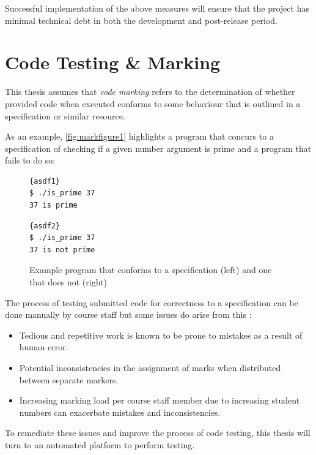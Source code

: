 \documentclass[hidelinks]{report}
\begin{document}
Successful implementation of the above measures will ensure that the project has minimal technical debt in both the development and post-release period.

\section{Code Testing \& Marking}

This thesis assumes that \textit{code marking} refers to the determination of whether provided code when executed conforms to some behaviour that is outlined in a specification or similar resource.

As an example, \autoref{fig:markfigure1} highlights a program that concurs to a specification of checking if a given number argument is prime and a program that fails to do so:

\begin{figure}[h]
	\centering
	\noindent
	\begin{multicols}{2}
		\begin{lstlisting}[linewidth=0.95\linewidth, title=Correct Program, frame=tlrb]{asdf1}
$ ./is_prime 37
37 is prime
		\end{lstlisting}
		\begin{lstlisting}[linewidth=0.95\linewidth, title=Incorrect Program, frame=tlrb]{asdf2}
$ ./is_prime 37
37 is not prime
		\end{lstlisting}
	\end{multicols}
	\caption{Example program that conforms to a specification (left) and one that does not (right)}
	\label{fig:markfigure1}
\end{figure}

The process of testing submitted code for correctness to a specification can be done manually by course staff but some issues do arise from this \cite{ManualProblem}:
\begin{itemize}
	\item Tedious and repetitive work is known to be prone to mistakes as a result of human error.
	\item Potential inconsistencies in the assignment of marks when distributed between separate markers.
	\item Increasing marking load per course staff member due to increasing student numbers can exacerbate mistakes and inconsistencies.
\end{itemize}

To remediate these issues and improve the process of code testing, this thesis will turn to an automated platform to perform testing.
\end{document}
